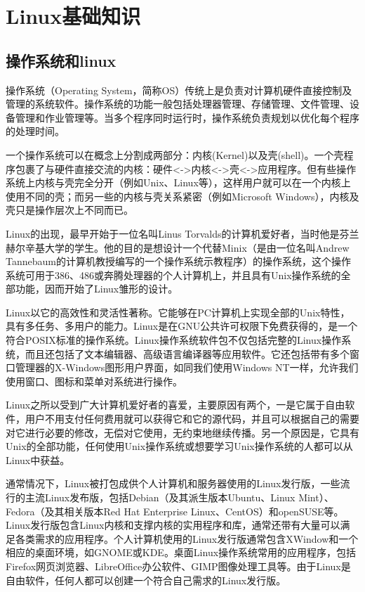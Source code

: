 \chapter{Linux基础知识}


\section{操作系统和linux}
操作系统（Operating System，简称OS）传统上是负责对计算机硬件直接控制及管理的系统软件。操作系统的功能一般包括处理器管理、存储管理、文件管理、设备管理和作业管理等。当多个程序同时运行时，操作系统负责规划以优化每个程序的处理时间。

一个操作系统可以在概念上分割成两部分：内核(Kernel)以及壳(shell)。一个壳程序包裹了与硬件直接交流的内核：硬件<->内核<->壳<->应用程序。但有些操作系统上内核与壳完全分开（例如Unix、Linux等），这样用户就可以在一个内核上使用不同的壳；而另一些的内核与壳关系紧密（例如Microsoft Windows），内核及壳只是操作层次上不同而已。

Linux的出现，最早开始于一位名叫Linus Torvalds的计算机爱好者，当时他是芬兰赫尔辛基大学的学生。他的目的是想设计一个代替Minix（是由一位名叫Andrew Tannebaum的计算机教授编写的一个操作系统示教程序）的操作系统，这个操作系统可用于386、486或奔腾处理器的个人计算机上，并且具有Unix操作系统的全部功能，因而开始了Linux雏形的设计。 

Linux以它的高效性和灵活性著称。它能够在PC计算机上实现全部的Unix特性，具有多任务、多用户的能力。Linux是在GNU公共许可权限下免费获得的，是一个符合POSIX标准的操作系统。Linux操作系统软件包不仅包括完整的Linux操作系统，而且还包括了文本编辑器、高级语言编译器等应用软件。它还包括带有多个窗口管理器的X-Windows图形用户界面，如同我们使用Windows NT一样，允许我们使用窗口、图标和菜单对系统进行操作。 

Linux之所以受到广大计算机爱好者的喜爱，主要原因有两个，一是它属于自由软件，用户不用支付任何费用就可以获得它和它的源代码，并且可以根据自己的需要对它进行必要的修改，无偿对它使用，无约束地继续传播。另一个原因是，它具有Unix的全部功能，任何使用Unix操作系统或想要学习Unix操作系统的人都可以从Linux中获益。

通常情况下，Linux被打包成供个人计算机和服务器使用的Linux发行版，一些流行的主流Linux发布版，包括Debian（及其派生版本Ubuntu、Linux Mint）、Fedora（及其相关版本Red Hat Enterprise Linux、CentOS）和openSUSE等。Linux发行版包含Linux内核和支撑内核的实用程序和库，通常还带有大量可以满足各类需求的应用程序。个人计算机使用的Linux发行版通常包含XWindow和一个相应的桌面环境，如GNOME或KDE。桌面Linux操作系统常用的应用程序，包括Firefox网页浏览器、LibreOffice办公软件、GIMP图像处理工具等。由于Linux是自由软件，任何人都可以创建一个符合自己需求的Linux发行版。
